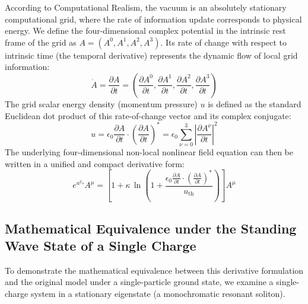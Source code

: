 \documentclass[12pt, a4paper]{article}
\begin{document}
According to Computational Realism, the vacuum is an absolutely stationary computational grid, where the rate of information update corresponds to physical energy. We define the four-dimensional complex potential in the intrinsic rest frame of the grid as $A = (A^0, A^1, A^2, A^3)$. Its rate of change with respect to intrinsic time (the temporal derivative) represents the dynamic flow of local grid information:
\begin{equation}
\dot{A} = \frac{\partial A}{\partial t} = \left( \frac{\partial A^0}{\partial t}, \frac{\partial A^1}{\partial t}, \frac{\partial A^2}{\partial t}, \frac{\partial A^3}{\partial t} \right)
\end{equation}
The grid scalar energy density (momentum pressure) $u$ is defined as the standard Euclidean dot product of this rate-of-change vector and its complex conjugate:
\begin{equation}
u = \epsilon_0 \frac{\partial A}{\partial t} \cdot \left( \frac{\partial A}{\partial t} \right)^* = \epsilon_0 \sum_{\nu=0}^{3} \left| \frac{\partial A^\nu}{\partial t} \right|^2
\end{equation}
The underlying four-dimensional non-local nonlinear field equation can then be written in a unified and compact derivative form:
\begin{equation}
e^{a^2 \square} A^\mu = \left[ 1 + \kappa \, \ln \left( 1 + \frac{\epsilon_0 \frac{\partial A}{\partial t} \cdot \left( \frac{\partial A}{\partial t} \right)^*}{u_{\mathrm{th}}} \right) \right] A^\mu
\end{equation}

\subsection{Mathematical Equivalence under the Standing Wave State of a Single Charge}

To demonstrate the mathematical equivalence between this derivative formulation and the original model under a single-particle ground state, we examine a single-charge system in a stationary eigenstate (a monochromatic resonant soliton).
\end{document}

